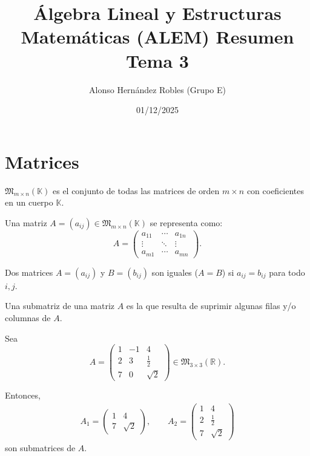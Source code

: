 \documentclass[a4paper,12pt]{article}
\title{Álgebra Lineal y Estructuras Matemáticas (ALEM) Resumen Tema 3}
\author{Alonso Hernández Robles (Grupo E)}
\date{01/12/2025}
\begin{document}
\maketitle

\tableofcontents
\newpage

\section{Matrices}

\begin{procedimiento}[title=Definición de $\mathfrak{M}_{m \times n}(\mathbb{K})$]
$\mathfrak{M}_{m \times n}(\mathbb{K})$ es el conjunto de todas las matrices de orden $m \times n$ con coeficientes en un cuerpo $\mathbb{K}$.
\end{procedimiento}

\begin{procedimiento}[title=Representación matricial]
Una matriz $A = (a_{ij}) \in \mathfrak{M}_{m \times n}(\mathbb{K})$ se representa como:
\[
A =
\begin{pmatrix}
a_{11} & \cdots & a_{1n} \\
\vdots & \ddots & \vdots \\
a_{m1} & \cdots & a_{mn}
\end{pmatrix}.
\]
\end{procedimiento}

\begin{procedimiento}[title=Igualdad de matrices]
Dos matrices $A = (a_{ij})$ y $B = (b_{ij})$ son iguales ($A = B$) si $a_{ij} = b_{ij}$ para todo $i,j$.
\end{procedimiento}

\begin{procedimiento}[title=Submatriz]
Una submatriz de una matriz $A$ es la que resulta de suprimir algunas filas y/o columnas de $A$.
\end{procedimiento}

\begin{ejemplo}[title=Ejemplos de submatrices]
Sea
\[
A=
\begin{pmatrix}
1 & -1 & 4 \\
2 & 3 & \tfrac{1}{2} \\
7 & 0 & \sqrt{2}
\end{pmatrix}
\in \mathfrak{M}_{3\times 3}(\mathbb{R}).
\]

Entonces,
\[
\begin{aligned}
A_1=
\begin{pmatrix}
1 & 4 \\
7 & \sqrt{2}
\end{pmatrix},
\qquad
A_2=
\begin{pmatrix}
1 & 4 \\
2 & \tfrac{1}{2} \\
7 & \sqrt{2}
\end{pmatrix}
\end{aligned}
\]
son submatrices de $A$.
\end{ejemplo}
\end{document}

